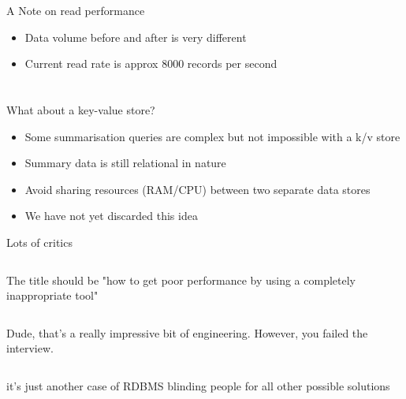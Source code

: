 \documentclass{beamer}
\begin{document}
\begin{frame}{A Note on read performance}
  \begin{itemize}
  \item Data volume before and after is very different
  \item Current read rate is approx 8000 records per second
  \end{itemize}
\end{frame}

\section{}
\subsection{}

\begin{frame}{What about a key-value store?}
  \begin{itemize}
  \item Some summarisation queries are complex but not impossible with a k/v store
  \item Summary data is still relational in nature
  \item Avoid sharing resources (RAM/CPU) between two separate data stores
  \item We have not yet discarded this idea
  \end{itemize}
\end{frame}

\begin{frame}{Lots of critics}
  \small{
  \begin{columns}[t]
    \begin{block}{}
    The title should be "how to get poor performance by using a completely inappropriate tool"
    \end{block}
  \end{columns}

  \vfill

  \begin{columns}[t]
    Dude, that's a really impressive bit of engineering. However, you failed the interview.
  \end{columns}

  \vfill

  \begin{columns}[t]
    \begin{block}{}
    it's just another case of RDBMS blinding people for all other possible solutions
    \end{block}
  \end{columns}
  }
\end{frame}
\end{document}
